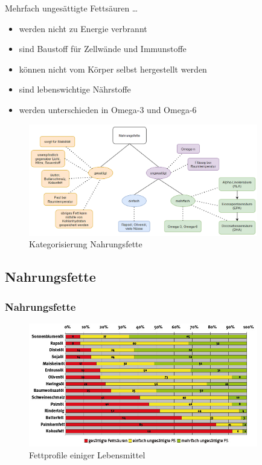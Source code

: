 \documentclass[xcolor=dvipsnames]{beamer}
\begin{document}
\begin{frame}[allowframebreaks]
        \begin{block}{Mehrfach ungesättigte Fettsäuren \ldots}
            \begin{itemize}
                \setlength\itemsep{1em}
                \item werden nicht zu Energie verbrannt
                \item sind Baustoff für Zellwände und Immunstoffe
                \item können nicht vom Körper selbst hergestellt werden
                \item sind lebenswichtige Nährstoffe
                \item werden unterschieden in Omega-3 und Omega-6
            \end{itemize}
        \end{block}

        \framebreak

        \begin{figure}
            \centering
            \includegraphics[width=10cm]{../images/nahrungsfette.png}
            \caption{Kategorisierung Nahrungsfette}
        \end{figure}
    \end{frame}

    \subsection{Nahrungsfette}
    \begin{frame}[allowframebreaks]
        \frametitle{Nahrungsfette}

        \begin{figure}
            \centering
            \includegraphics[width=10cm]{../images/fettprofile.png}
            \caption{Fettprofile einiger Lebensmittel}
        \end{figure}

    \end{frame}
\end{document}
